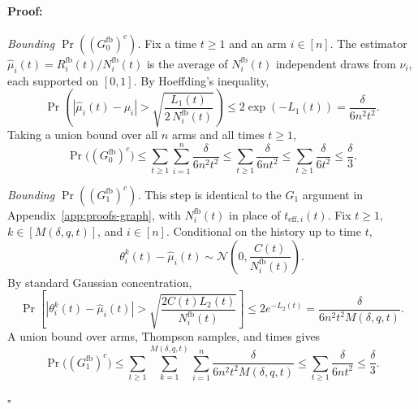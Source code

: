 \documentclass{article}
\newenvironment{proof}{\paragraph{Proof:}}{\hfill$\square$}
\begin{document}
\begin{proof}
\emph{Bounding $\Pr((G_0^{\mathrm{fb}})^c)$.}
Fix a time $t\ge 1$ and an arm $i\in[n]$. The estimator $\widehat\mu_i(t)=R_i^{\mathrm{fb}}(t)/N_i^{\mathrm{fb}}(t)$ is the average of $N_i^{\mathrm{fb}}(t)$ independent draws from $\nu_i$, each supported on $[0,1]$. By Hoeffding's inequality,
\[
\Pr\!\left(
|\widehat\mu_i(t)-\mu_i|>\sqrt{\frac{L_1(t)}{2\,N_i^{\mathrm{fb}}(t)}}
\right)
\le 2\exp(-L_1(t))
= \frac{\delta}{6n^2t^2}.
\]
Taking a union bound over all $n$ arms and all times $t\ge 1$,
\[
\Pr\!\bigl((G_0^{\mathrm{fb}})^c\bigr)
\le
\sum_{t\ge 1}\sum_{i=1}^n \frac{\delta}{6n^2t^2}
\le
\sum_{t\ge 1}\frac{\delta}{6nt^2}
\le
\sum_{t\ge 1}\frac{\delta}{6t^2}
\le \frac{\delta}{3}.
\]

\emph{Bounding $\Pr((G_1^{\mathrm{fb}})^c)$.}
This step is identical to the $G_1$ argument in Appendix~\ref{app:proofs-graph}, with $N_i^{\mathrm{fb}}(t)$ in place of $t_{\mathrm{eff},i}(t)$. Fix $t\ge 1$, $k\in[M(\delta,q,t)]$, and $i\in[n]$. Conditional on the history up to time $t$,
\[
\theta_i^k(t)-\widehat\mu_i(t)
\sim \mathcal N\!\left(0,\frac{C(t)}{N_i^{\mathrm{fb}}(t)}\right).
\]
By standard Gaussian concentration,
\[
\Pr\!\left[
|\theta_i^k(t)-\widehat\mu_i(t)|>
\sqrt{\frac{2C(t)L_2(t)}{N_i^{\mathrm{fb}}(t)}}
\right]
\le 2e^{-L_2(t)}
= \frac{\delta}{6n^2t^2M(\delta,q,t)}.
\]
A union bound over arms, Thompson samples, and times gives
\[
\Pr\!\bigl((G_1^{\mathrm{fb}})^c\bigr)
\le
\sum_{t\ge 1}\sum_{k=1}^{M(\delta,q,t)}\sum_{i=1}^n
\frac{\delta}{6n^2t^2M(\delta,q,t)}
\le
\sum_{t\ge 1}\frac{\delta}{6nt^2}
\le
\frac{\delta}{3}.
\]


\end{proof}
\end{document}
